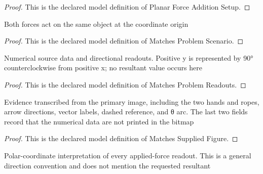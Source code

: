 \begin{proof}
  This is the declared model definition of Planar Force Addition Setup.
\end{proof}
\begin{definition}
  \label{def:physics:phyx-mini-0677:phyxminiproblems-problemphyxmini0677-matchesproblemscenario}
  Both forces act on the same object at the coordinate origin
\end{definition}
\begin{proof}
  This is the declared model definition of Matches Problem Scenario.
\end{proof}
\begin{definition}
  \label{def:physics:phyx-mini-0677:phyxminiproblems-problemphyxmini0677-matchesproblemreadouts}
  Numerical source data and directional readouts. Positive y is represented by 90° counterclockwise from positive x; no resultant value occurs here
\end{definition}
\begin{proof}
  This is the declared model definition of Matches Problem Readouts.
\end{proof}
\begin{definition}
  \label{def:physics:phyx-mini-0677:phyxminiproblems-problemphyxmini0677-matchessuppliedfigure}
  Evidence transcribed from the primary image, including the two hands and ropes, arrow directions, vector labels, dashed reference, and θ arc. The last two fields record that the numerical data are not printed in the bitmap
\end{definition}
\begin{proof}
  This is the declared model definition of Matches Supplied Figure.
\end{proof}
\begin{definition}
  \label{def:physics:phyx-mini-0677:phyxminiproblems-problemphyxmini0677-obeyspolarforcedirectionconvention}
  Polar-coordinate interpretation of every applied-force readout. This is a general direction convention and does not mention the requested resultant
\end{definition}
